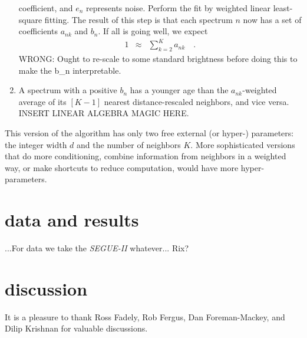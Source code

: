 \documentclass[12pt, preprint]{aastex}
\newcommand{\project}[1]{\textsl{#1}}
\begin{document}
\begin{enumerate}
  coefficient, and $e_n$ represents noise.  Perform the fit by
  weighted linear least-square fitting.  The result of this step is
  that each spectrum $n$ now has a set of coefficients $a_{nk}$ and
  $b_n$.  If all is going well, we expect
  \begin{eqnarray}
    1 &\approx& \sum_{k=2}^K a_{nk}
    \quad .
  \end{eqnarray}
  WRONG: Ought to re-scale to some standard brightness before doing
  this to make the b_n interpretable.
\item A spectrum with a positive $b_n$ has a younger age than the
  $a_{nk}$-weighted average of its $[K-1]$ nearest distance-rescaled
  neighbors, and vice versa.  INSERT LINEAR ALGEBRA MAGIC HERE.
\end{enumerate}

This version of the algorithm has only two free external (or hyper-)
parameters: the integer width $d$ and the number of neighbors $K$.
More sophisticated versions that do more conditioning, combine
information from neighbors in a weighted way, or make shortcuts to
reduce computation, would have more hyper-parameters.

\section{data and results}

...For data we take the \project{SEGUE-II} whatever... Rix?

\section{discussion}

\acknowledgements It is a pleasure to thank
  Ross Fadely,
  Rob Fergus,
  Dan Foreman-Mackey, and
  Dilip Krishnan
for valuable discussions.
\end{document}
